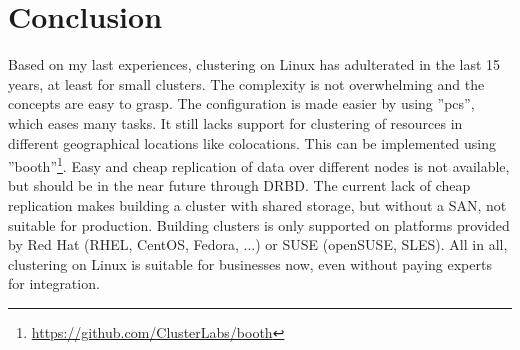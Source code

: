 \section{Conclusion}
Based on my last experiences, clustering on Linux has adulterated in the 
last 15 years, at least for small clusters. The complexity is not
overwhelming and the concepts are easy to grasp. The configuration is made
easier by using ''pcs'', which eases many tasks. It still lacks support
for clustering of resources in different geographical locations like colocations.
This can be implemented using ''booth''\footnote{\url{https://github.com/ClusterLabs/booth}}.
Easy and cheap replication of data over different nodes is not available, but should
be in the near future through \ac{DRBD}. The current lack of cheap replication
makes building a cluster with shared storage, but without a SAN, not suitable
for production. Building clusters is only supported on platforms provided
by Red Hat (RHEL, CentOS, Fedora, ...) or SUSE (openSUSE, SLES).
All in all, clustering on Linux is suitable for businesses now, even without
paying experts for integration.
